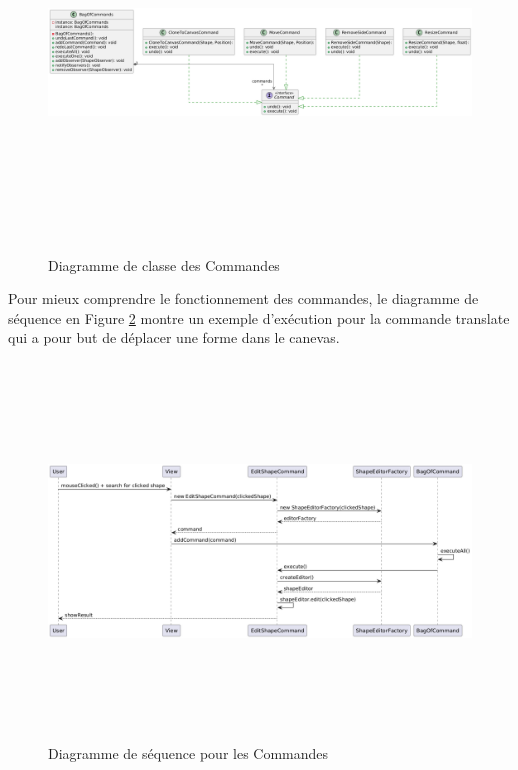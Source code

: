 \documentclass{article}
\begin{document}
\begin{figure}[h]
    \centering
    \includegraphics[width=\textwidth,height=10.0cm,keepaspectratio]{command.png}
    \caption{Diagramme de classe des Commandes}
    \label{Command}
\end{figure}
\FloatBarrier

Pour mieux comprendre le fonctionnement des commandes, le diagramme de séquence en Figure \ref{CommandDS} montre un exemple d'exécution
pour la commande translate qui a pour but de déplacer une forme dans le canevas.

\begin{figure}[h]
    \centering
    \includegraphics[width=\textwidth,height=10.0cm,keepaspectratio]{DS_command.png}
    \caption{Diagramme de séquence pour les Commandes}
    \label{CommandDS}
\end{figure}
\FloatBarrier
\end{document}

